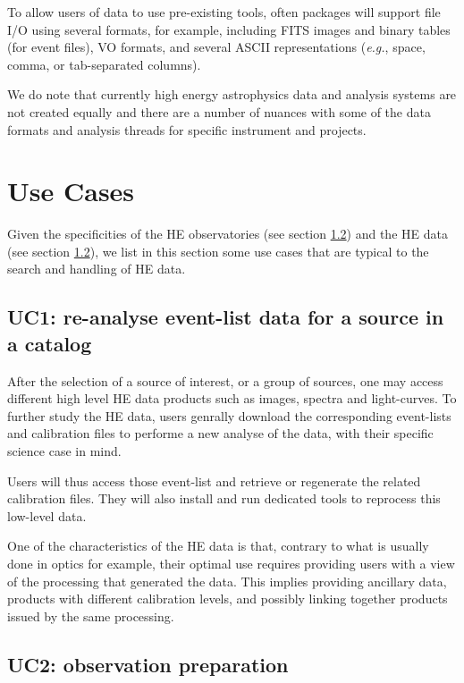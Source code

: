 \documentclass[11pt,a4paper]{ivoa}
\begin{document}
{To allow users of data to use pre-existing tools, often packages will support file I/O using several formats, for example, including FITS images and binary tables (for event files), VO formats, and several ASCII representations ({\em e.g.\/}, space, comma, or tab-separated columns).

We do note that currently high energy astrophysics data and analysis systems are not created equally and there are a number of nuances with some of the data formats and analysis threads for specific instrument and projects.


\section{Use Cases}

Given the specificities of the HE observatories (see section \ref{}) and the HE data (see section \ref{}), we list in this section some use cases that are typical to the search and handling of HE data.

\subsection{UC1: re-analyse event-list data for a source in a catalog}

After the selection of a source of interest, or a group of sources, one may access different high level HE data products such as
images, spectra and light-curves. To further study the HE data, users genrally download the corresponding event-lists and calibration files to performe a new analyse of the data, with their specific science case in mind.

Users will thus access those event-list and retrieve or regenerate the related calibration files. They will also install and run dedicated tools to reprocess this low-level data.

One of the characteristics of the HE data is that, contrary to what is usually done in optics for example, their optimal
use requires providing users with a view of the processing that generated the data. This implies providing ancillary data,
products with different calibration levels, and possibly linking together products issued by the same processing.


\subsection{UC2: observation preparation}

}
\end{document}
